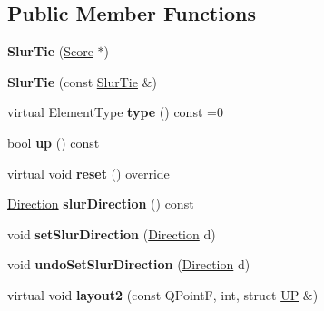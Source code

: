 \subsection*{Public Member Functions}
\begin{DoxyCompactItemize}
\item 
\mbox{\label{class_ms_1_1_slur_tie_ae02c85599633e93dd64a24bbfa0c4890}} 
{\bfseries Slur\+Tie} (\hyperlink{class_ms_1_1_score}{Score} $\ast$)
\item 
\mbox{\label{class_ms_1_1_slur_tie_a52346d0cd18ad0429e50e7662d55d05c}} 
{\bfseries Slur\+Tie} (const \hyperlink{class_ms_1_1_slur_tie}{Slur\+Tie} \&)
\item 
\mbox{\label{class_ms_1_1_slur_tie_a10184ff54b668b21ca51372ab5f8bf0f}} 
virtual Element\+Type {\bfseries type} () const =0
\item 
\mbox{\label{class_ms_1_1_slur_tie_a603f4e019fb851cdebd3520941e325ab}} 
bool {\bfseries up} () const
\item 
\mbox{\label{class_ms_1_1_slur_tie_ad29f8ef186d8fc1e8880e3f7dcce2763}} 
virtual void {\bfseries reset} () override
\item 
\mbox{\label{class_ms_1_1_slur_tie_a769b241096821e89bbbd718906593d99}} 
\hyperlink{class_ms_1_1_direction}{Direction} {\bfseries slur\+Direction} () const
\item 
\mbox{\label{class_ms_1_1_slur_tie_a75dd383160f7b06c7292377da4e17511}} 
void {\bfseries set\+Slur\+Direction} (\hyperlink{class_ms_1_1_direction}{Direction} d)
\item 
\mbox{\label{class_ms_1_1_slur_tie_ab30e00da8c097de6101d35fe632db228}} 
void {\bfseries undo\+Set\+Slur\+Direction} (\hyperlink{class_ms_1_1_direction}{Direction} d)
\item 
\mbox{\label{class_ms_1_1_slur_tie_af3f9247c9ebc7ad6348af8b1596820d0}} 
virtual void {\bfseries layout2} (const Q\+PointF, int, struct \hyperlink{struct_ms_1_1_u_p}{UP} \&)
\item 

\end{DoxyCompactItemize}

